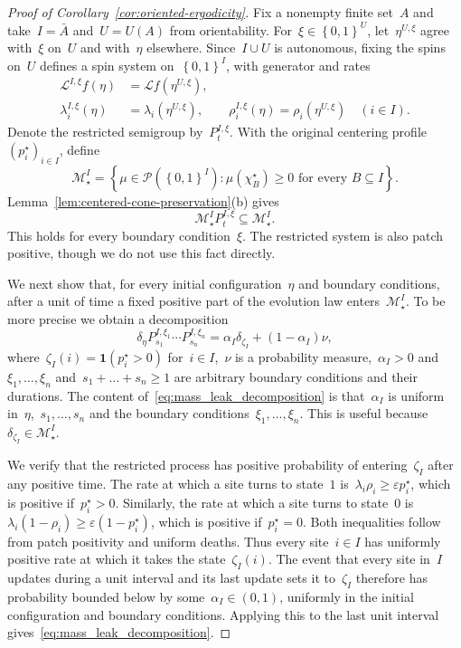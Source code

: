\documentclass[EJP,preprint,NODS,nobera]{ejpecp}
\newcommand{\bb}[1]{\left(#1\right)}
\newcommand{\cb}[1]{\left\{#1\right\}}
\newcommand{\ind}{\mathbf{1}}
\newcommand{\Lcal}{\mathcal{L}}
\begin{document}
\begin{proof}[Proof of Corollary~\ref{cor:oriented-ergodicity}]
    

Fix a nonempty finite set~$A$ and take~$I=\bar A$ and~$U=U(A)$ from
orientability. For~$\xi\in\cb{0,1}^U$, let~$\eta^{U,\xi}$ agree with~$\xi$
on~$U$ and with~$\eta$ elsewhere. Since~$I\cup U$ is autonomous, fixing
the spins on~$U$ defines a spin system on~$\cb{0,1}^I$, with generator
and rates
\begin{align*}
\Lcal^{I,\xi}f(\eta)&=\Lcal f(\eta^{U,\xi}),\\
\lambda_i^{I,\xi}(\eta)&=\lambda_i(\eta^{U,\xi}),
\qquad
\rho_i^{I,\xi}(\eta)=\rho_i(\eta^{U,\xi})
\quad(i\in I).
\end{align*}
Denote the restricted semigroup by~$P_t^{I,\xi}$. With the original centering profile~$(p_i^\star)_{i\in I}$, define
\begin{equation*}
\mathcal M_\star^I
=\cb{\mu\in\mathcal P\bb{\cb{0,1}^I}:
       \mu(\chi_B^\star)\geq0\text{ for every }B\subseteq I}.
\end{equation*}
Lemma~\ref{lem:centered-cone-preservation}\textup{(b)} gives
\begin{equation*}
\mathcal M_\star^I P_t^{I,\xi}\subseteq\mathcal M_\star^I.
\end{equation*}
This holds for every boundary condition~$\xi$. The restricted system is also patch positive, though we do not use this fact directly.

We next show that, for every initial configuration~$\eta$ and boundary conditions, after a unit of time a fixed positive part of the evolution law enters~$\mathcal{M}_\star^I$. To be more precise we obtain a decomposition
\begin{equation}\label{eq:mass_leak_decomposition}
    \delta_\eta P_{s_1}^{I,\xi_1}\cdots P_{s_n}^{I,\xi_n} = \alpha_I \delta_{\zeta_I} + \bb{1-\alpha_I}\nu,
\end{equation}
where~$\zeta_I(i) = \ind\bb{p_i^\star > 0}$ for~$i\in I$,~$\nu$ is a probability measure,~$\alpha_I>0$ and~$\xi_1,\dots,\xi_n$ and~$s_1+\dots +s_n\geq 1$ are arbitrary boundary conditions and their durations. The content of~\eqref{eq:mass_leak_decomposition} is that~$\alpha_I$ is uniform in~$\eta$,~$s_1,\dots,s_n$ and the boundary conditions~$\xi_1,\dots,\xi_n$. This is useful because~$\delta_{\zeta_I}\in\mathcal{M}_\star^I$.

We verify that the restricted process has positive probability of entering~$\zeta_I$ after any positive time. The rate at which a site turns to state~$1$ is~$\lambda_i\rho_i  \geq \varepsilon p_i^\star$, which is positive if~$p_i^\star>0$. Similarly, the rate at which a site turns to state~$0$ is~$\lambda_i\bb{1 - \rho_i}\geq \varepsilon \bb{1-p_i^\star}$, which is positive if~$p_i^\star = 0$. Both inequalities follow from patch positivity and uniform deaths. Thus every site~$i\in I$ has uniformly positive rate at which it takes the state~$\zeta_I(i)$. The event that every site in~$I$ updates during a unit interval and its last update sets it to~$\zeta_I$ therefore has probability bounded below by some~$\alpha_I\in(0,1)$, uniformly in the initial configuration and boundary conditions. Applying this to the last unit interval gives~\eqref{eq:mass_leak_decomposition}.


\end{proof}
\end{document}
